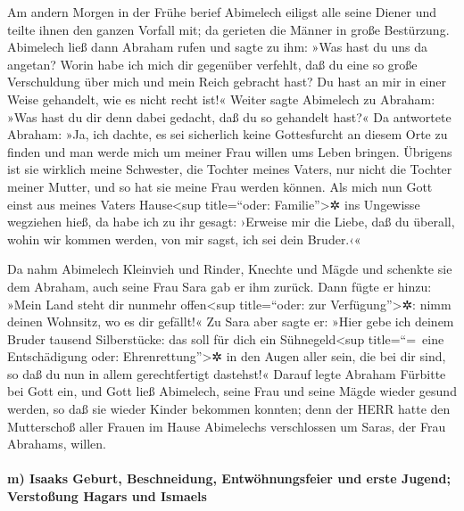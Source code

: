  Am andern Morgen in der Frühe berief Abimelech eiligst
alle seine Diener und teilte ihnen den ganzen Vorfall mit; da gerieten
die Männer in große Bestürzung.  Abimelech ließ dann
Abraham rufen und sagte zu ihm: »Was hast du uns da angetan? Worin habe
ich mich dir gegenüber verfehlt, daß du eine so große Verschuldung über
mich und mein Reich gebracht hast? Du hast an mir in einer Weise
gehandelt, wie es nicht recht ist!«  Weiter sagte
Abimelech zu Abraham: »Was hast du dir denn dabei gedacht, daß du so
gehandelt hast?«  Da antwortete Abraham: »Ja, ich dachte,
es sei sicherlich keine Gottesfurcht an diesem Orte zu finden und man
werde mich um meiner Frau willen ums Leben bringen. 
Übrigens ist sie wirklich meine Schwester, die Tochter meines Vaters,
nur nicht die Tochter meiner Mutter, und so hat sie meine Frau werden
können.  Als mich nun Gott einst aus meines Vaters
Hause\textless sup title=``oder: Familie''\textgreater✲ ins Ungewisse
wegziehen hieß, da habe ich zu ihr gesagt: ›Erweise mir die Liebe, daß
du überall, wohin wir kommen werden, von mir sagst, ich sei dein
Bruder.‹«

 Da nahm Abimelech Kleinvieh und Rinder, Knechte und
Mägde und schenkte sie dem Abraham, auch seine Frau Sara gab er ihm
zurück.  Dann fügte er hinzu: »Mein Land steht dir
nunmehr offen\textless sup title=``oder: zur Verfügung''\textgreater✲:
nimm deinen Wohnsitz, wo es dir gefällt!«  Zu Sara aber
sagte er: »Hier gebe ich deinem Bruder tausend Silberstücke: das soll
für dich ein Sühnegeld\textless sup title=``=~eine Entschädigung oder:
Ehrenrettung''\textgreater✲ in den Augen aller sein, die bei dir sind,
so daß du nun in allem gerechtfertigt dastehst!«  Darauf
legte Abraham Fürbitte bei Gott ein, und Gott ließ Abimelech, seine Frau
und seine Mägde wieder gesund werden, so daß sie wieder Kinder bekommen
konnten;  denn der HERR hatte den Mutterschoß aller
Frauen im Hause Abimelechs verschlossen um Saras, der Frau Abrahams,
willen.

\hypertarget{m-isaaks-geburt-beschneidung-entwuxf6hnungsfeier-und-erste-jugend-verstouxdfung-hagars-und-ismaels}{%
\paragraph{m) Isaaks Geburt, Beschneidung, Entwöhnungsfeier und erste
Jugend; Verstoßung Hagars und
Ismaels}\label{m-isaaks-geburt-beschneidung-entwuxf6hnungsfeier-und-erste-jugend-verstouxdfung-hagars-und-ismaels}}

